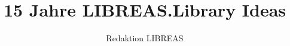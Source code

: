 \title{15 Jahre LIBREAS.\newlineCover Library Ideas}
\author{Redaktion LIBREAS}
\renewcommand{\lsSeries}{dummyseries}



\renewcommand{\lsSeriesNumber}{}
